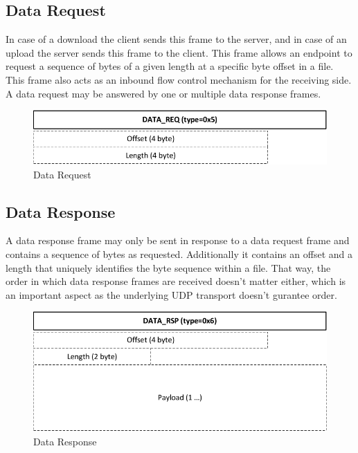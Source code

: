 \documentclass[]{article}
\begin{document}
\subsection{Data Request}

In case of a download the client sends this frame to the
server, and in case of an upload the server sends this
frame to the client. This frame allows an endpoint to 
request a sequence of bytes of a given length at a specific
byte offset in a file. This frame also acts as an inbound
flow control mechanism for the receiving side. A data 
request may be answered by one or multiple data response
frames.

\begin{figure}[H]
\centering
\includegraphics[width=\textwidth]{frames/data-req.pdf}
\caption{Data Request}
\label{DATA-REQ}
\end{figure}

\subsection{Data Response}

A data response frame may only be sent in response to a data request frame and
contains a sequence of bytes as requested.
Additionally it contains an offset and a length that uniquely identifies the byte sequence
within a file. That way, the order in which data response frames are received doesn't matter
either, which is an important aspect as the underlying UDP transport doesn't gurantee order.
 
\begin{figure}[H]
\centering
\includegraphics[width=\textwidth]{frames/data-rsp.pdf}
\caption{Data Response}
\label{DATA-RSP}
\end{figure}
\end{document}
